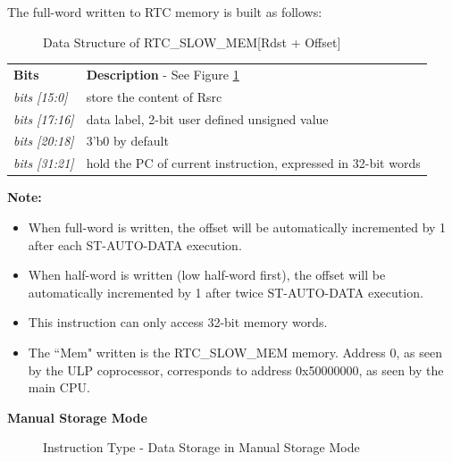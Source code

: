 \documentclass[main\_\_EN.tex]{subfiles}
\begin{document}
The full-word written to RTC memory is built as follows:

%
%
%
%
\begin{figure}[!ht ]
    \centering
    \caption{Data Structure of RTC\_SLOW\_MEM[Rdst + Offset]}
    \label{figure:RTCMEM}
\end{figure}

\begin{tabular}{ l l }
\textbf{Bits} & \textbf{Description} - See Figure \ref{figure:RTCMEM} \\
\textit{bits [15:0] } & store the content of Rsrc\\
\textit{bits [17:16] } & data label, 2-bit user defined unsigned value\\
\textit{bits [20:18]} & 3'b0 by default \\
\textit{bits [31:21]} & hold the PC of current instruction, expressed in 32-bit words\\

\end{tabular}

\textbf{Note:}
\begin{itemize}
    \item When full-word is written, the offset will be automatically incremented by 1 after each ST-AUTO-DATA execution.
    \item When half-word is written (low half-word first), the offset will be automatically incremented by 1 after twice ST-AUTO-DATA execution.
    \item This instruction can only access 32-bit memory words.
    \item The ``Mem" written is the RTC\_SLOW\_MEM memory. Address 0, as seen by the ULP coprocessor, corresponds to address 0x{}50000000, as seen by the main CPU.
\end{itemize}


\textcolor{istcolor}{\textbf{ Manual Storage Mode}}


%
%
%
%
%
%
%
%
%
%
\begin{figure}[!ht ]
    \centering
    \caption{Instruction Type - Data Storage in Manual Storage Mode}
    \label{figure:STM}
\end{figure}
\end{document}
